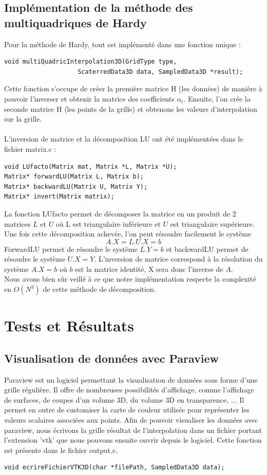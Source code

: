 \documentclass[a4paper,9pt]{article}
\begin{document}
\subsection{Implémentation de la méthode des multiquadriques de Hardy}
\label{subsec:hardy_implementation}
Pour la méthode de Hardy, tout est implémenté dans une fonction unique :
\begin{verbatim}
void multiQuadricInterpolation3D(GridType type, 
                    ScaterredData3D data, SampledData3D *result);
\end{verbatim}
Cette fonction s'occupe de créer la première matrice H (les données) de manière à pouvoir l'inverser et obtenir la matrice des coefficients $\alpha_{i}$. Ensuite, l'on crée la seconde matrice H (les points de la grille) et obtenons les valeurs d'interpolation sur la grille.\\\\
L'inversion de matrice et la décomposition LU ont été implémentées dans le fichier matrix.c :
\begin{verbatim}
void LUfacto(Matrix mat, Matrix *L, Matrix *U);
Matrix* forwardLU(Matrix L, Matrix b);
Matrix* backwardLU(Matrix U, Matrix Y);
Matrix* invert(Matrix matrix);
\end{verbatim}
La fonction LUfacto permet de décomposer la matrice en un produit de 2 matrices $L$ et $U$ où L est triangulaire inférieure et $U$ est triangulaire supérieure. Une fois cette décomposition achevée, l'on peut résoudre facilement le système $$A.X=L.U.X=b$$ ForwardLU permet de résoudre le système $L.Y=b$ et backwardLU permet de résoudre le système $U.X=Y$. L'inversion de matrice correspond à la résolution du système $A.X=b$ où $b$ est la matrice identité, X sera donc l'inverse de $A$.\\
Nous avons bien sûr veillé à ce que notre implémentation respecte la complexité en $O(N^{3})$ de cette méthode de décomposition.

\section{Tests et Résultats}
\label{sec:tests_resultats}

\subsection{Visualisation de données avec Paraview}
\label{subsec:paraview}
Paraview est un logiciel permettant la visualisation de données sous forme d'une grille régulière. Il offre de nombreuses possibilités d'affichage, comme l'affichage de surfaces, de coupes d'un volume 3D, du volume 3D en transparence, ... Il permet en outre de customiser la carte de couleur utilisée pour représenter les valeurs scalaires associées aux points. Afin de pouvoir visualiser les données avec paraview, nous écrivons la grille résultat de l'interpolation dans un fichier portant l'extension 'vtk' que nous pouvons ensuite ouvrir depuis le logiciel. Cette fonction est présente dans le fichier output.c.
\begin{verbatim}
void ecrireFichierVTK3D(char *filePath, SampledData3D data);
\end{verbatim}
\end{document}
